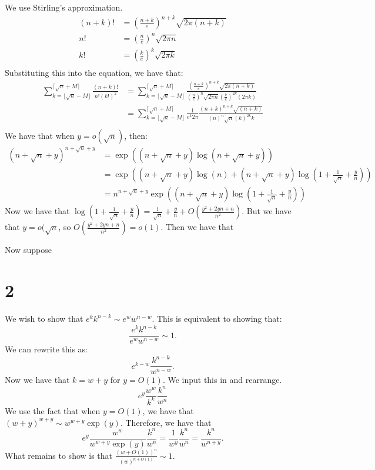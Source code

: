 \documentclass[]{article}
\begin{document}
We use Stirling's approximation.
\begin{align*}
	(n + k)! &= \left(\frac{n + k}{e}\right)^{n + k}\sqrt{2\pi (n + k)}\\
	n! &= \left(\frac{n}{e}\right)^n \sqrt{2 \pi n}\\
	k! &= \left(\frac{k}{e}\right)^k \sqrt{2 \pi k}\\
\end{align*}
Substituting this into the equation, we have that:
\begin{align*}
	\sum_{k = \lfloor \sqrt{n} - M \rfloor }^{ \lceil \sqrt{n} + M \rceil}  \frac{(n + k)!}{n!(k!)^2}
	&=
	\sum_{k = \lfloor \sqrt{n} - M \rfloor }^{ \lceil \sqrt{n} + M \rceil} \frac{\left(\frac{n + k}{e}\right)^{n + k}\sqrt{2\pi (n + k)}}{\left(\frac{n}{e}\right)^n \sqrt{2 \pi n} \left(\frac{k}{e}\right)^{2k} (2 \pi k)}\\
	&=
	\sum_{k = \lfloor \sqrt{n} - M \rfloor }^{ \lceil \sqrt{n} + M \rceil} \frac{1}{e^k 2\pi} \frac{\left(n + k\right)^{n + k}\sqrt{(n + k)}}{\left(n\right)^n \sqrt{n} \left(k\right)^{2k}k }\\
\end{align*}
We have that when $y = o(\sqrt{n})$, then:
\begin{align*}
	(n + \sqrt{n} + y)^{n + \sqrt{n} + y} &= \exp\left((n + \sqrt{n} + y) \log(n + \sqrt{n} + y)\right)\\
	&=
	\exp\left((n + \sqrt{n} + y) \log(n) +  (n + \sqrt{n} + y) \log (1 + \frac{1}{\sqrt{n}} + \frac{y}{n})\right)\\
	&=
	n^{n + \sqrt{n} + y} \exp\left((n + \sqrt{n} + y) \log(1 + \frac{1}{\sqrt{n}} + \frac{y}{n})
	\right)
\end{align*}
Now we have that $\log(1 + \frac{1}{\sqrt{n}} + \frac{y}{n}) = \frac{1}{\sqrt{n}} + \frac{y}{n} + O(\frac{y^2 + 2yn + n}{n^2})$. But we have that $y = o(\sqrt{n}$, so $O(\frac{y^2 + 2yn + n}{n^2}) = o(1)$. Then we have that 

Now suppose 
\section{2}
We wish to show that $e^k k^{n - k} \sim e^w w^{n - w}$. This is equivalent to showing that:
\begin{equation}
	\frac{e^k k^{n - k}}{e^w w^{n - w}} \sim 1.
\end{equation}
We can rewrite this as:
\begin{equation}
	e^{k - w} \frac{k^{n - k}}{w^{n - w}}.
\end{equation}
Now we have that $k = w + y$ for $y = O(1)$. We input this in and rearrange.
\begin{equation}
	e^{y} \frac{w^w}{k^k} \frac{k^n}{w^n} 
\end{equation}
We use the fact that when $y = O(1)$, we have that $(w + y)^{w + y} \sim w^{w + y}\exp(y)$. Therefore, we have that 
\begin{equation}
	e^{y} \frac{w^w}{w^{w + y}\exp(y)} \frac{k^n}{w^n} = \frac{1}{w^y} \frac{k^n}{w^n} = \frac{k^n}{w^{n + y}}.
\end{equation}
What remains to show is that $\frac{(w + O(1))^n}{(w)^{n + O(1)}} \sim 1$. 
\end{document}
